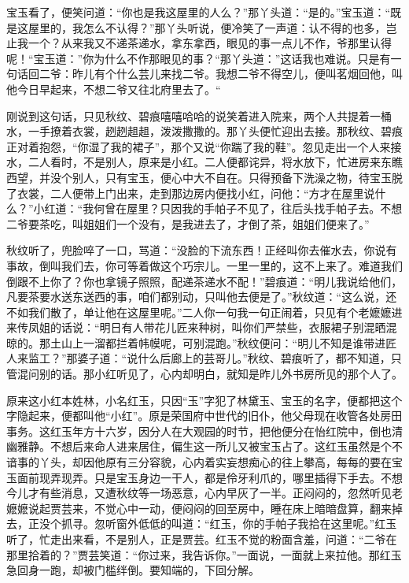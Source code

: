 \documentclass[12pt,oneside]{book}
\begin{document}
宝玉看了，便笑问道：“你也是我这屋里的人么？”那丫头道：“是的。”宝玉道：“既是这屋里的，我怎么不认得？”那丫头听说，便冷笑了一声道：认不得的也多，岂止我一个？从来我又不递茶递水，拿东拿西，眼见的事一点儿不作，爷那里认得呢！“宝玉道：”你为什么不作那眼见的事？“那丫头道：”这话我也难说。只是有一句话回二爷：昨儿有个什么芸儿来找二爷。我想二爷不得空儿，便叫茗烟回他，叫他今日早起来，不想二爷又往北府里去了。“

刚说到这句话，只见秋纹、碧痕嘻嘻哈哈的说笑着进入院来，两个人共提着一桶水，一手撩着衣裳，趔趔趄趄，泼泼撒撒的。那丫头便忙迎出去接。那秋纹、碧痕正对着抱怨，“你湿了我的裙子”，那个又说“你踹了我的鞋”。忽见走出一个人来接水，二人看时，不是别人，原来是小红。二人便都诧异，将水放下，忙进房来东瞧西望，并没个别人，只有宝玉，便心中大不自在。只得预备下洗澡之物，待宝玉脱了衣裳，二人便带上门出来，走到那边房内便找小红，问他：“方才在屋里说什么？”小红道：“我何曾在屋里？只因我的手帕子不见了，往后头找手帕子去。不想二爷要茶吃，叫姐姐们一个没有，是我进去了，才倒了茶，姐姐们便来了。”

秋纹听了，兜脸啐了一口，骂道：“没脸的下流东西！正经叫你去催水去，你说有事故，倒叫我们去，你可等着做这个巧宗儿。一里一里的，这不上来了。难道我们倒跟不上你了？你也拿镜子照照，配递茶递水不配！”碧痕道：“明儿我说给他们，凡要茶要水送东送西的事，咱们都别动，只叫他去便是了。”秋纹道：“这么说，还不如我们散了，单让他在这屋里呢。”二人你一句我一句正闹着，只见有个老嬷嬷进来传凤姐的话说：“明日有人带花儿匠来种树，叫你们严禁些，衣服裙子别混晒混晾的。那土山上一溜都拦着帏幙呢，可别混跑。”秋纹便问：“明儿不知是谁带进匠人来监工？”那婆子道：“说什么后廊上的芸哥儿。”秋纹、碧痕听了，都不知道，只管混问别的话。那小红听见了，心内却明白，就知是昨儿外书房所见的那个人了。

原来这小红本姓林，小名红玉，只因“玉”字犯了林黛玉、宝玉的名字，便都把这个字隐起来，便都叫他“小红”。原是荣国府中世代的旧仆，他父母现在收管各处房田事务。这红玉年方十六岁，因分人在大观园的时节，把他便分在怡红院中，倒也清幽雅静。不想后来命人进来居住，偏生这一所儿又被宝玉占了。这红玉虽然是个不谙事的丫头，却因他原有三分容貌，心内着实妄想痴心的往上攀高，每每的要在宝玉面前现弄现弄。只是宝玉身边一干人，都是伶牙利爪的，哪里插得下手去。不想今儿才有些消息，又遭秋纹等一场恶意，心内早灰了一半。正闷闷的，忽然听见老嬷嬷说起贾芸来，不觉心中一动，便闷闷的回至房中，睡在床上暗暗盘算，翻来掉去，正没个抓寻。忽听窗外低低的叫道：“红玉，你的手帕子我拾在这里呢。”红玉听了，忙走出来看，不是别人，正是贾芸。红玉不觉的粉面含羞，问道：“二爷在那里拾着的？”贾芸笑道：“你过来，我告诉你。”一面说，一面就上来拉他。那红玉急回身一跑，却被门槛绊倒。要知端的，下回分解。
\end{document}
